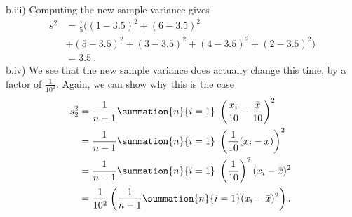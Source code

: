 \documentclass{report}
\begin{document}
    \bigbreak \noindent 
    b.iii) Computing the new sample variance gives
    \begin{align*}
        s^{2} &= \frac{1}{5}((1-3.5)^{2} + (6-3.5)^{2} \\
       &+ (5-3.5)^{2} + (3-3.5)^{2} + (4-3.5)^{2} + (2-3.5)^{2})\\ 
       &=3.5  \
    .\end{align*}
    \bigbreak \noindent 
    b.iv) We see that the new sample variance does actually change this time, by a factor of $\frac{1}{10^{2}}$. Again, we can show why this is the case
    \begin{align*}
        s_{2}^{2} &= \frac{1}{n-1}\summation{n}{i=1}\ \left(\frac{x_{i}}{10} - \frac{\bar{x}}{10}\right)^{2} \\
        &=\frac{1}{n-1}\summation{n}{i=1}\ \left(\frac{1}{10}(x_{i}-\bar{x})\right)^{2}\ \\
        &=\frac{1}{n-1}\summation{n}{i=1}\ \left(\frac{1}{10}\right)^{2}(x_{i}-\bar{x})^{2}\ \\
        &=\frac{1}{10^{2}}\left(\frac{1}{n-1}\summation{n}{i=1}(x_{i}-\bar{x})^{2} \right)
    .\end{align*}
\end{document}

